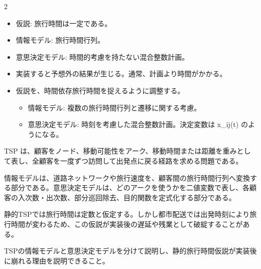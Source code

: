 \begin{multicols}{2}

\footnotesize

\raggedcolumns


\begin{itemize}
\item 仮説: 旅行時間は一定である。
\item 情報モデル: 旅行時間行列。
\item 意思決定モデル: 時間的考慮を持たない混合整数計画。
\item 実装すると予想外の結果が生じる。通常、計画より時間がかかる。
\item 仮説を、時間依存旅行時間を捉えるように調整する。
\begin{itemize}
\item 情報モデル: 複数の旅行時間行列と遷移に関する考慮。
\item 意思決定モデル: 時刻を考慮した混合整数計画。決定変数は x\_ij(t) のようになる。
\end{itemize}
\end{itemize}

TSP は、顧客をノード、移動可能性をアーク、移動時間または距離を重みとして表し、全顧客を一度ずつ訪問して出発点に戻る経路を求める問題である。\par

情報モデルは、道路ネットワークや旅行速度を、顧客間の旅行時間行列へ変換する部分である。意思決定モデルは、どのアークを使うかを二値変数で表し、各顧客の入次数・出次数、部分巡回除去、目的関数を定式化する部分である。\par

静的TSPでは旅行時間は定数と仮定する。しかし都市配送では出発時刻により旅行時間が変わるため、この仮説が実装後の遅延や残業として破綻することがある。\par

TSPの情報モデルと意思決定モデルを分けて説明し、静的旅行時間仮説が実装後に崩れる理由を説明できること。\par


\end{multicols}
